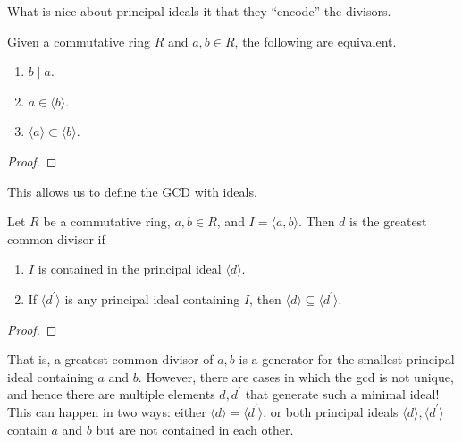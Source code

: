  What is nice about principal ideals it that they ``encode'' the divisors. 

  \begin{theorem}
    Given a commutative ring $R$ and $a, b \in R$, the following are equivalent. 
    \begin{enumerate}
      \item $b \mid a$. 
      \item $a \in \langle b \rangle$. 
      \item $\langle a \rangle \subset \langle b \rangle$. 
    \end{enumerate}
  \end{theorem}
  \begin{proof}
    
  \end{proof}

  This allows us to define the GCD with ideals. 

  \begin{corollary}
    Let $R$ be a commutative ring, $a, b \in R$, and $I = \langle a, b \rangle$. Then $d$ is the greatest common divisor if 
    \begin{enumerate}
      \item $I$ is contained in the principal ideal $\langle d \rangle$. 
      \item If $\langle d^\prime \rangle$ is any principal ideal containing $I$, then $\langle d \rangle \subseteq \langle d^\prime \rangle$. 
    \end{enumerate}
  \end{corollary}
  \begin{proof}
    
  \end{proof}

  That is, a greatest common divisor of $a, b$ is a generator for the smallest principal ideal containing $a$ and $b$. However, there are cases in which the gcd is not unique, and hence there are multiple elements $d, d^\prime$ that generate such a minimal ideal! This can happen in two ways: either $\langle d \rangle = \langle d^\prime \rangle$, or both principal ideals $\langle d \rangle, \langle d^\prime \rangle$ contain $a$ and $b$ but are not contained in each other. 

